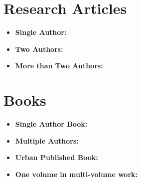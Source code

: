 \section{Research Articles}
\begin{itemize}
    \item \textbf{Single Author:}
    \citet{bowen2018data}
    \item \textbf{Two Authors:}
    \citet{bowen1728philosophy}
    \item \textbf{More than Two Authors:} \citet{barrientos2021feasibility}
\end{itemize}

\section{Books}

\begin{itemize}
    \item \textbf{Single Author Book:} \citet{schwabish2020elevate}
    \item \textbf{Multiple Authors:} \citet{burman2020taxes}
    \item \textbf{Urban Published Book:}
    \citet{cordes2009nonprofits}
    \item \textbf{One volume in multi-volume work:} \citet{bowen2021book}
\end{itemize}